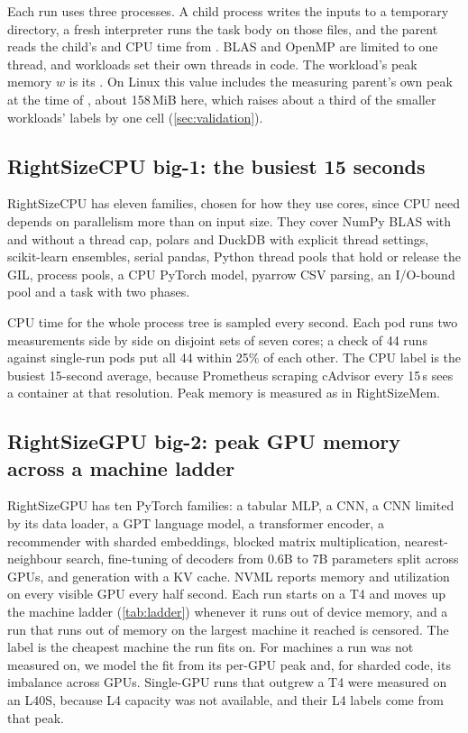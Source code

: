 Each run uses three processes. A child process writes the inputs to a temporary directory, a fresh interpreter
runs the task body on those files, and the parent reads the child's  and CPU time from
. BLAS and OpenMP are limited to one thread, and workloads set their own threads in code. The
workload's peak memory $w$ is its . On Linux this value includes the measuring parent's own
peak at the time of , about 158\,MiB here, which raises about a third of the smaller workloads'
labels by one cell (\cref{sec:validation}).

\subsection{RightSizeCPU big-1: the busiest 15 seconds}
RightSizeCPU has eleven families, chosen for how they use cores, since CPU need depends on parallelism more
than on input size. They cover NumPy BLAS with and without a thread cap, polars and DuckDB with explicit thread
settings, scikit-learn ensembles, serial pandas, Python thread pools that hold or release the GIL, process
pools, a CPU PyTorch model, pyarrow CSV parsing, an I/O-bound pool and a task with two phases.

CPU time for the whole process tree is sampled every second. Each pod runs two measurements side by side on
disjoint sets of seven cores; a check of 44 runs against single-run pods put all 44 within 25\% of each other.
The CPU label is the busiest 15-second average, because Prometheus scraping cAdvisor every 15\,s sees a
container at that resolution. Peak memory is measured as in RightSizeMem.

\subsection{RightSizeGPU big-2: peak GPU memory across a machine ladder}
RightSizeGPU has ten PyTorch families: a tabular MLP, a CNN, a CNN limited by its data loader, a GPT language
model, a transformer encoder, a recommender with sharded embeddings, blocked matrix multiplication,
nearest-neighbour search, fine-tuning of decoders from 0.6B to 7B parameters split across GPUs, and generation
with a KV cache. NVML reports memory and utilization on every visible GPU every half second. Each run starts on
a T4 and moves up the machine ladder (\cref{tab:ladder}) whenever it runs out of device memory, and a run that
runs out of memory on the largest machine it reached is censored. The label is the cheapest machine the run fits
on. For machines a run was not measured on, we model the fit from its per-GPU peak and, for sharded code, its
imbalance across GPUs. Single-GPU runs that outgrew a T4 were measured on an L40S, because L4 capacity was not
available, and their L4 labels come from that peak.

